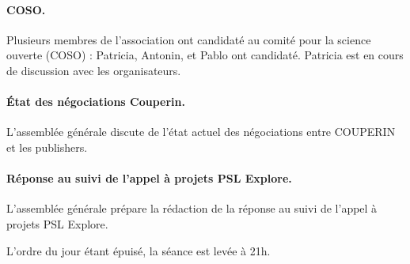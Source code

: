 \documentclass{scrartcl}
\begin{document}
\paragraph{COSO.}
Plusieurs membres de l'association ont candidaté au comité pour la science
ouverte (COSO) : Patricia, Antonin, et Pablo ont candidaté. Patricia est en
cours de discussion avec les organisateurs.

\paragraph{État des négociations Couperin.}
L'assemblée générale discute de l'état actuel des négociations entre COUPERIN et
les publishers.

\paragraph{Réponse au suivi de l'appel à projets PSL Explore.}
L'assemblée générale prépare la rédaction de la réponse au suivi de l'appel à
projets PSL Explore.

\bigskip

L'ordre du jour étant épuisé, la séance est levée à 21h.
\end{document}
